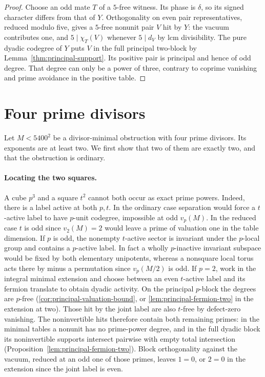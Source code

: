 \documentclass[11pt,a4paper]{article}
\numberwithin{equation}{section}
\theoremstyle{remark}
\begin{document}
\begin{proof}
Choose an odd mate $T$ of a $5$-free witness. Its phase is
$\delta$, so its signed character differs from that of $Y$.
Orthogonality on even pair representatives, reduced modulo
five, gives a $5$-free nonunit pair $V$ hit by $Y$: the vacuum
contributes one, and $5\mid\chi_T(V)$ whenever $5\mid d_V$ by
lcm divisibility. The pure dyadic codegree of $Y$ puts $V$ in the
full principal two-block by Lemma~\ref{thm:principal-support}.
Its positive pair is principal and hence of odd degree. That
degree can only be a power of three, contrary to coprime vanishing
and prime avoidance in the positive table.
\end{proof}

\section{Four prime divisors}\label{short:four}
Let $M<5400^2$ be a divisor-minimal obstruction with four prime divisors.
Its exponents are at least two. We first show that two of them are exactly
two, and that the obstruction is ordinary.

\paragraph{Locating the two squares.}
A cube $p^3$ and a square $t^2$ cannot both occur as exact prime powers.
Indeed, there is a label active at both $p,t$. In the ordinary case
separation would force a $t$-active label to have $p$-unit codegree,
impossible at odd $v_p(M)$. In the reduced case $t$ is odd since
$v_2(M)=2$ would leave a prime of valuation one in the table dimension.
If $p$ is odd, the nonempty $t$-active sector is invariant under the
$p$-local group and contains a $p$-active label. In fact a wholly
$p$-inactive invariant subspace would be fixed by both elementary
unipotents, whereas a nonsquare local torus acts there by minus a
permutation since $v_p(M/2)$ is odd. If $p=2$, work in the integral
minimal extension and choose between an even $t$-active label and its
fermion translate to obtain dyadic activity.
On the principal $p$-block the degrees are $p$-free
(\ref{cor:principal-valuation-bound}, or \ref{lem:principal-fermion-two}
in the extension at two). Those hit by the joint label are also
$t$-free by defect-zero vanishing. The noninvertible hits therefore
contain both remaining primes: in the minimal tables a nonunit has no
prime-power degree, and in the full dyadic block its noninvertible supports
intersect pairwise with empty total intersection
(Proposition~\ref{lem:principal-fermion-two}). Block orthogonality against the vacuum,
reduced at an odd one of those primes, leaves $1=0$, or $2=0$ in the
extension since the joint label is even.
\end{document}
